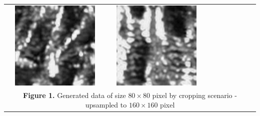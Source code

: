 \documentclass{article}
\begin{document}
\begin{table}[t]
\begin{tabular}{ccccccc}
   			\includegraphics[scale=0.32]{Images/generated_data_80x80_upsampled/186000_00760.jpg}  &
   			\includegraphics[scale=0.32]{Images/generated_data_80x80_upsampled/129000_00150.jpg}  \\
   			
	\multicolumn{7}{c}{\textbf{Figure 1.} Generated data of size $80 \times 80$ pixel by cropping scenario - upsampled to $160 \times 160$ pixel}
	\end{tabular}
	\label{generated-data}
\end{table}
\end{document}
